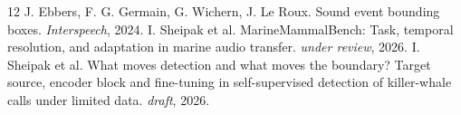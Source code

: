 \documentclass[10pt,twocolumn]{article}
\begin{document}
\begin{thebibliography}{12}
 J. Ebbers, F. G. Germain, G. Wichern, J. Le Roux. Sound event bounding boxes. \emph{Interspeech}, 2024.
 I. Sheipak et al. MarineMammalBench: Task, temporal resolution, and adaptation in marine audio transfer. \emph{under review}, 2026.
 I. Sheipak et al. What moves detection and what moves the boundary? Target source, encoder block and fine-tuning in self-supervised detection of killer-whale calls under limited data. \emph{draft}, 2026.
\end{thebibliography}
\end{document}

